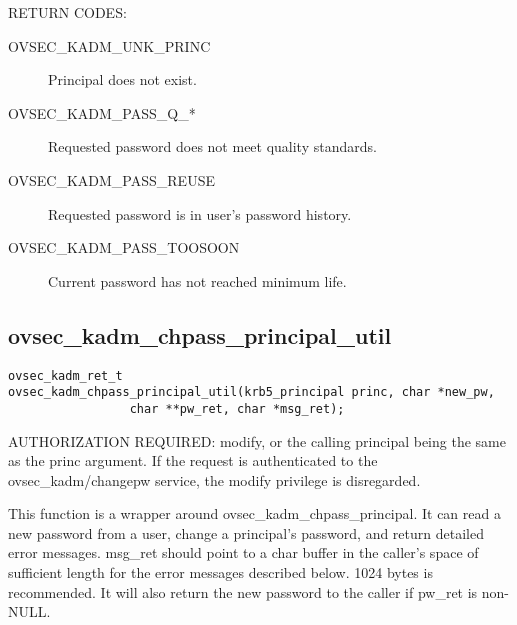 RETURN CODES:

\begin{description}
\item[OVSEC_KADM_UNK_PRINC] Principal does not exist.
\item[OVSEC_KADM_PASS_Q_*] Requested password does not meet quality
standards. 
\item[OVSEC_KADM_PASS_REUSE] Requested password is in user's
password history. 
\item[OVSEC_KADM_PASS_TOOSOON] Current password has not reached minimum
life. 
\end{description}


\subsection{ovsec_kadm_chpass_principal_util}

\begin{verbatim}
ovsec_kadm_ret_t
ovsec_kadm_chpass_principal_util(krb5_principal princ, char *new_pw, 
				 char **pw_ret, char *msg_ret);
\end{verbatim}

AUTHORIZATION REQUIRED: modify, or the calling principal being the
same as the princ argument.  If the request is authenticated to the
ovsec_kadm/changepw service, the modify privilege is disregarded.

This function is a wrapper around ovsec_kadm_chpass_principal. It can
read a new password from a user, change a principal's password, and
return detailed error messages.  msg_ret should point to a char buffer
in the caller's space of sufficient length for the error messages
described below. 1024 bytes is recommended.  It will also return the
new password to the caller if pw_ret is non-NULL.

